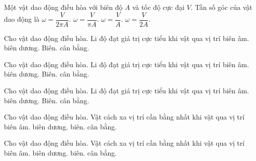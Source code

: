 \begin{ex}
Một vật dao động điều hòa với biên độ $A$ và tốc độ cực đại $V$. Tần số góc của vật dao động là
\choice
{$\omega =\dfrac{V}{2\pi A}.$}
{$\omega =\dfrac{V}{\pi A}.$}
{\True $\omega =\dfrac{V}{A}.$}
{$\omega =\dfrac{V}{2A}.$}
\end{ex}

\begin{ex}
Cho vật dao động điều hòa. Li độ đạt giá trị cực tiểu khi vật qua vị trí
\choice
{\True biên âm.}
{biên dương.}
{Biên.}
{cân bằng.}
\end{ex}

\begin{ex}
Cho vật dao động điều hòa. Li độ đạt giá trị cực tiểu khi vật qua vị trí
\choice
{\True biên âm.}
{biên dương.}
{Biên.}
{cân bằng.}
\end{ex}

\begin{ex}
Cho vật dao động điều hòa. Li độ đạt giá trị cực tiểu khi vật qua vị trí
\choice
{\True biên âm.}
{biên dương.}
{Biên.}
{cân bằng.}
\end{ex}

\begin{ex}
Cho vật dao động điều hòa. Vật cách xa vị trí cần bằng nhất khi vật qua vị trí
\choice
{biên âm.}
{biên dương.}
{biên.}
{\True cân bằng.}
\end{ex}

\begin{ex}
Cho vật dao động điều hòa. Vật cách xa vị trí cần bằng nhất khi vật qua vị trí
\choice
{biên âm.}
{biên dương.}
{biên.}
{\True cân bằng.}
\end{ex}
